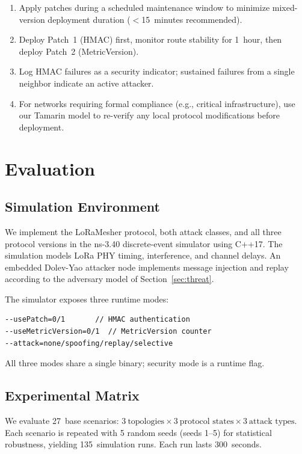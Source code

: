 \documentclass[journal]{IEEEtran}
\begin{document}
\begin{enumerate}
  \item Apply patches during a scheduled maintenance window to
    minimize mixed-version deployment duration ($<$15~minutes
    recommended).
  \item Deploy Patch~1 (HMAC) first, monitor route stability for
    1~hour, then deploy Patch~2 (MetricVersion).
  \item Log HMAC failures as a security indicator; sustained failures
    from a single neighbor indicate an active attacker.
  \item For networks requiring formal compliance (e.g., critical
    infrastructure), use our Tamarin model to re-verify any local
    protocol modifications before deployment.
\end{enumerate}

\section{Evaluation}
\label{sec:eval}

\subsection{Simulation Environment}

We implement the LoRaMesher protocol, both attack classes, and all
three protocol versions in the ns-3.40 discrete-event simulator using
C++17. The simulation models LoRa PHY timing, interference, and
channel delays. An embedded Dolev-Yao attacker node implements message
injection and replay according to the adversary model of
Section~\ref{sec:threat}.

The simulator exposes three runtime modes:
\begin{lstlisting}
--usePatch=0/1       // HMAC authentication
--useMetricVersion=0/1  // MetricVersion counter
--attack=none/spoofing/replay/selective
\end{lstlisting}

All three modes share a single binary; security mode is a runtime flag.

\subsection{Experimental Matrix}

We evaluate 27~base scenarios:
$3~\text{topologies} \times 3~\text{protocol states} \times
3~\text{attack types}$. Each scenario is repeated with 5 random
seeds (seeds 1–5) for statistical robustness, yielding
135~simulation runs. Each run lasts 300~seconds.
\end{document}
